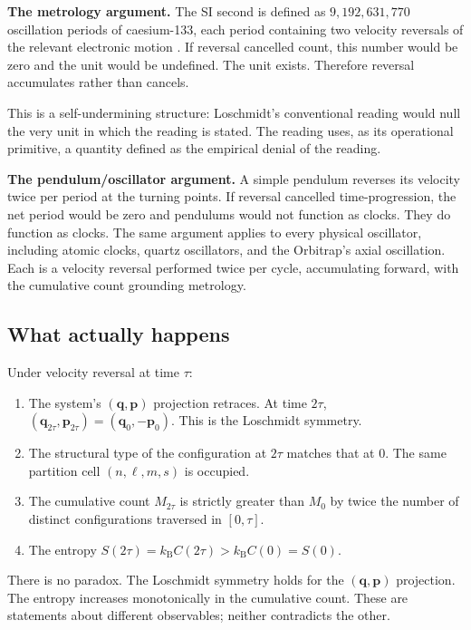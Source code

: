 \documentclass[twocolumn,10pt,a4paper]{article}
\theoremstyle{thmstyle}
\theoremstyle{definition}
\theoremstyle{remark}
\newcommand{\kB}{k_{\mathrm{B}}}
\begin{document}
\textbf{The metrology argument.} The SI second is defined as
$9{,}192{,}631{,}770$ oscillation periods of caesium-133, each
period containing two velocity reversals of the relevant electronic
motion \citep{si2019}. If reversal cancelled count, this number would
be zero and the unit would be undefined. The unit exists. Therefore
reversal accumulates rather than cancels.

This is a self-undermining structure: Loschmidt's conventional
reading would null the very unit in which the reading is stated. The
reading uses, as its operational primitive, a quantity defined as the
empirical denial of the reading.

\textbf{The pendulum/oscillator argument.} A simple pendulum reverses
its velocity twice per period at the turning points. If reversal
cancelled time-progression, the net period would be zero and pendulums
would not function as clocks. They do function as clocks. The same
argument applies to every physical oscillator, including atomic
clocks, quartz oscillators, and the Orbitrap's axial oscillation.
Each is a velocity reversal performed twice per cycle, accumulating
forward, with the cumulative count grounding metrology.

\subsection{What actually happens}

Under velocity reversal at time $\tau$:

\begin{enumerate}[nosep,leftmargin=*]
\item The system's $(\mathbf{q},\mathbf{p})$ projection retraces. At
time $2\tau$, $(\mathbf{q}_{2\tau},\mathbf{p}_{2\tau})
=(\mathbf{q}_{0},-\mathbf{p}_{0})$. This is the Loschmidt symmetry.
\item The structural type of the configuration at $2\tau$ matches
that at $0$. The same partition cell $(n,\ell,m,s)$ is occupied.
\item The cumulative count $M_{2\tau}$ is strictly greater than $M_{0}$
by twice the number of distinct configurations traversed in $[0,\tau]$.
\item The entropy $S(2\tau)=\kB C(2\tau)>\kB C(0)=S(0)$.
\end{enumerate}

There is no paradox. The Loschmidt symmetry holds for the
$(\mathbf{q},\mathbf{p})$ projection. The entropy increases monotonically
in the cumulative count. These are statements about different
observables; neither contradicts the other.
\end{document}
